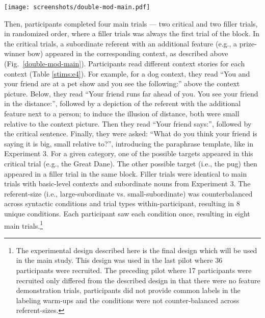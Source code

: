 \begin{figure*}[t]
	\begin{center}
		\texttt{[image: screenshots/double-mod-main.pdf]}
	\end{center}
	\vspace{-0.5cm}
	\caption{Example critical main trial in Experiment 4: Participants see a dog-context and read the corresponding cover story. The small-subordinate referent is described by a predicate-noun sentence.}
	\label{double-mod-main}
\end{figure*} 
Then, participants completed four main trials --- two critical and two filler trials, in randomized order, where a filler trials was always the first trial of the block. In the critical trials, a subordinate referent with an additional feature (e.g., a prize-winner bow) appeared in the corresponding context, as described above (Fig.~\ref{double-mod-main}). Participants read different context stories for each context (Table \ref{stims:e4}).  For example, for a dog context, they read “You and your friend are at a pet show and you see the following:” above the context picture. Below, they read “Your friend runs far ahead of you. You see your friend in the distance:”, followed by a depiction of the referent with the additional feature next to a person; to induce the illusion of distance, both were small relative to the context picture. Then they read “Your friend says:”, followed by the critical sentence. Finally, they were asked: “What do you think your friend is saying it is {big, small} relative to?”, introducing the paraphrase template, like in Experiment 3. For a given category, one of the possible targets appeared in this critical trial (e.g., the Great Dane). The other possible target (i.e., the pug) then appeared in a filler trial in the same block. Filler trials were identical to main trials with basic-level contexts and subordinate nouns from Experiment 3. The referent-size (i.e., large-subordinate vs. small-subordinate) was counterbalanced across syntactic conditions and trial types within-participant, resulting in 8 unique conditions. Each participant saw each condition once, resulting in eight main trials.\footnote{The experimental design described here is the final design which will be used in the main study. This design was used in the last pilot where 36 participants were recruited. The preceding pilot where 17 participants were recruited only differed from the described design in that there were no feature demonstration trials, participants did not provide common labels in the labeling warm-ups and the conditions were not counter-balanced across referent-sizes.}

